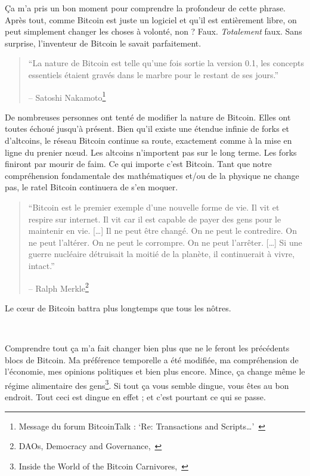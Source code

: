 Ça m'a pris un bon moment pour comprendre la profondeur de cette phrase. Après
tout, comme Bitcoin est juste un logiciel et qu'il est entièrement libre, on
peut simplement changer les choses à volonté, non ? Faux. \textit{Totalement}
faux. Sans surprise, l'inventeur de Bitcoin le savait parfaitement.

\begin{quotation}\begin{samepage}
\enquote{La nature de Bitcoin est telle qu'une fois sortie la version 0.1, les
concepts essentiels étaient gravés dans le marbre pour le restant de ses jours.}
\begin{flushright} -- Satoshi Nakamoto\footnote{Message du forum BitcoinTalk :
`Re: Transactions and Scripts\ldots'~\cite{satoshi-set-in-stone}}
\end{flushright}\end{samepage}\end{quotation}

De nombreuses personnes ont tenté de modifier la nature de Bitcoin. Elles ont
toutes échoué jusqu'à présent. Bien qu'il existe une étendue infinie de forks et
d'altcoins, le réseau Bitcoin continue sa route, exactement comme à la mise en
ligne du prenier nœud. Les altcoins n'importent pas sur le long terme. Les forks
finiront par mourir de faim. Ce qui importe c'est Bitcoin. Tant que notre
compréhension fondamentale des mathématiques et/ou de la physique ne change pas,
le ratel Bitcoin continuera de s'en moquer.

\begin{quotation}\begin{samepage}
\enquote{Bitcoin est le premier exemple d'une nouvelle forme de vie. Il vit et
respire sur internet. Il vit car il est capable de payer des gens pour le
maintenir en vie. [\ldots] Il ne peut être changé. On ne peut le contredire. On
ne peut l'altérer. On ne peut le corrompre. On ne peut l'arrêter. [\ldots] Si
une guerre nucléaire détruisait la moitié de la planète, il continuerait à
vivre, intact.}
\begin{flushright} -- Ralph Merkle\footnote{DAOs, Democracy and
Governance,~\cite{merkle-dao}}
\end{flushright}\end{samepage}\end{quotation}

Le cœur de Bitcoin battra plus longtemps que tous les nôtres.

~

Comprendre tout ça m'a fait changer bien plus que ne le feront les précédents
blocs de Bitcoin. Ma préférence temporelle a été modifiée, ma compréhension de
l'économie, mes opinions politiques et bien plus encore. Mince, ça change même
le régime alimentaire des gens\footnote{Inside the World of the Bitcoin
Carnivores,~\cite{carnivores}}. Si tout ça vous semble dingue, vous êtes au bon
endroit. Tout ceci est dingue en effet ; et c'est pourtant ce qui se passe.

